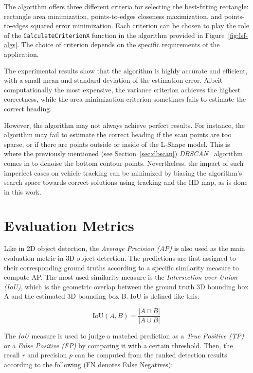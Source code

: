 The algorithm offers three different criteria for selecting the best-fitting rectangle: rectangle area minimization, points-to-edges closeness maximization, and points-to-edges squared error minimization.
Each criterion can be chosen to play the role of the \texttt{CalculateCriterionX} function in the algorithm provided in Figure~\ref{fig:lsf-algs}.
The choice of criterion depends on the specific requirements of the application.

The experimental results show that the algorithm is highly accurate and efficient, with a small mean and standard deviation of the estimation error.
Albeit computationally the most expensive, the variance criterion achieves the highest correctness, while the area minimization criterion sometimes fails to estimate the correct heading.

However, the algorithm may not always achieve perfect results.
For instance, the algorithm may fail to estimate the correct heading if the scan points are too sparse, or if there are points outside or inside of the L-Shape model.
This is where the previously mentioned (see Section~\ref{sec:dbscan}) \textit{DBSCAN}~\cite{schubert2017dbscan} algorithm comes in to denoise the bottom contour points.
Nevertheless, the impact of such imperfect cases on vehicle tracking can be minimized by biasing the algorithm's search space towards correct solutions using tracking and the HD map, as is done in this work.


\section{Evaluation Metrics}
\label{sec:evalmetrics}

Like in 2D object detection, the \textit{Average Precision (AP)} is also used as the main evaluation metric in 3D object detection.
The predictions are first assigned to their corresponding ground truths according to a specific similarity measure to compute AP\@.
The most used similarity measure is the \textit{Intersection over Union (IoU)}, which is the geometric overlap between the ground truth 3D bounding box A and the estimated 3D bounding box B\@.
IoU is defined like this:

\[
\text{IoU}(A,B) = \frac{|A \cap B|}{|A \cup B|}
\]

The \textit{IoU} measure is used to judge a matched prediction as a \textit{True Positive (TP)} or a \textit{False Positive (FP)} by comparing it with a certain threshold.
Then, the recall $r$ and precision $p$ can be computed from the ranked detection results according to the following (FN denotes False Negatives):


